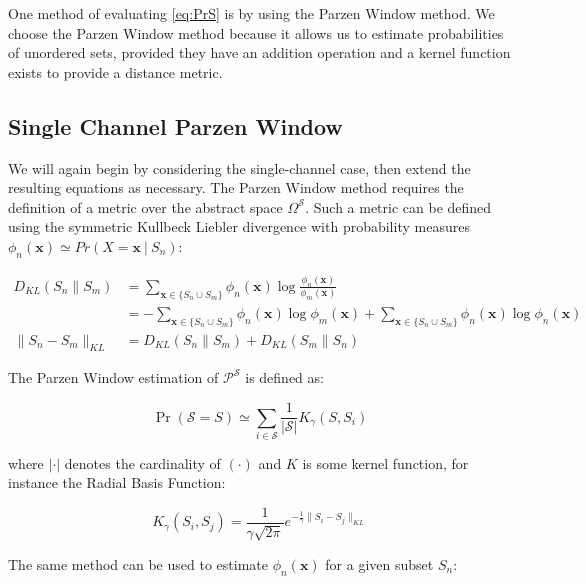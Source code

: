 \documentclass[10pt]{article}
\begin{document}
One method of evaluating \ref{eq:PrS} is by using the Parzen Window method.  We choose the Parzen Window method because it allows us to estimate probabilities of unordered sets, provided they have an addition operation and a kernel function exists to provide a distance metric.  

\subsection{ Single Channel Parzen Window}

We will again begin by considering the single-channel case, then extend the resulting equations as necessary.  The Parzen Window method requires the definition of a metric over the abstract space \( \Omega^\mathcal{S} \).  Such a metric can be defined using the symmetric Kullbeck Liebler divergence with probability measures \( \phi_n(\mathbf{x}) \simeq Pr(X = \mathbf{x} \ | \ S_n) \):

\begin{align} \label{eq:KLsingle}
D_{KL}(S_n\|S_m) &= \sum_{\mathbf{x} \in \{ S_n \cup S_m \} } \phi_n( \mathbf{x} ) \log \frac{ \phi_n(\mathbf{x}) }{ \phi_m( \mathbf{x} ) } \nonumber \\
&= -\sum_{\mathbf{x} \in \{ S_n \cup S_m \} } \phi_n(\mathbf{x}) \log \phi_m(\mathbf{x}) + \sum_{\mathbf{x} \in \{ S_n \cup S_m \} } \phi_n(\mathbf{x}) \log \phi_n(\mathbf{x}) \\
\|S_n - S_m\|_{KL} &= D_{KL}(S_n\|S_m) + D_{KL}(S_m\|S_n)
\end{align}

The Parzen Window estimation of \( \mathcal{P}^\mathcal{S} \) is defined as:

\begin{equation} \label{eq:PrSParzenSingle}
\Pr( \mathcal{S} = S ) \simeq \sum_{i \in \mathcal{S}}  \frac{1}{|\mathcal{S}| } K_\gamma( S, S_i ) 
\end{equation}

where \( | \cdot | \) denotes the cardinality of \( ( \cdot ) \) and \( K \) is some kernel function, for instance the Radial Basis Function:

\begin{equation} \label{eq:KRBFparzen}
K_\gamma( S_i, S_j ) =  \frac{1}{\gamma \sqrt{2\pi} } e^{-\frac{1}{\gamma} \|S_i - S_j \|_{KL}}
\end{equation}

The same method can be used to estimate \( \phi_n(\mathbf{x}) \) for a given subset \( S_n \):
\end{document}
